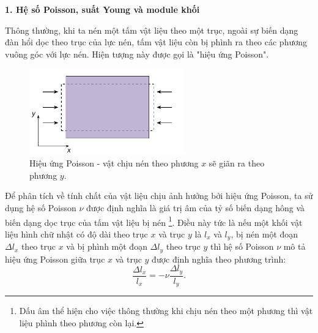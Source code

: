 \textbf{1. Hệ số Poisson, suất Young và module khối}

Thông thường, khi ta nén một tấm vật liệu theo một trục, ngoài sự biến dạng đàn hổi dọc theo trục của lực nén, tấm vật liệu còn bị phình ra theo các phương vuông góc với lực nén. Hiện tượng này được gọi là "hiệu ứng Poisson". 

\begin{figure}[!h]
    \centering
    \includegraphics[width=0.6\textwidth]{Problem_1/Figs_P1/Poisson_effect.pdf}
    \caption{Hiệu ứng Poisson - vật chịu nén theo phương \(x\) sẽ giãn ra theo phương \(y\).}
    \label{fig:Poisson_effect}
\end{figure}

Để phân tích về tính chất của vật liệu chịu ảnh hưởng bởi hiệu ứng Poisson, ta sử dụng hệ số Poisson \(\nu\) được định nghĩa là giá trị âm của tỷ số biến dạng hông và biến dạng dọc trục của tấm vật liệu bị nén \footnote{Dấu âm thể hiện cho việc thông thường khi chịu nén theo một phương thì vật liệu phình theo phương còn lại.}. Điều này tức là nếu một khối vật liệu hình chữ nhật có độ dài theo trục \(x\) và trục \(y\) là \(l_x\) và \(l_y\), bị nén một đoạn \(\Delta l_x\) theo trục \(x\) và bị phình một đoạn \(\Delta l_y\) theo trục \(y\) thì hệ số Poisson \(\nu\) mô tả hiệu ứng Poisson giữa trục \(x\) và trục \(y\) được định nghĩa theo phương trình:
\begin{equation}
    \dfrac{\Delta l_x}{l_x} = - \nu \dfrac{\Delta l_y}{l_y}.
\end{equation}

